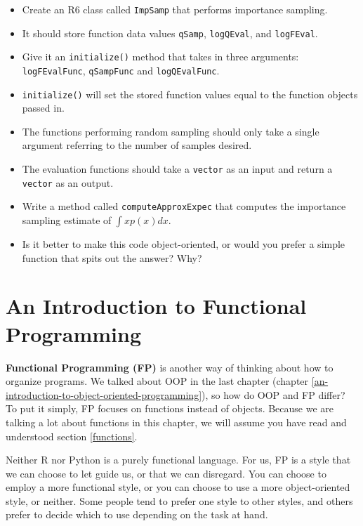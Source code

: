 \documentclass[12pt,krantz2]{krantz}
\providecommand{\tightlist}{%
  \setlength{\itemsep}{0pt}\setlength{\parskip}{0pt}}
\begin{document}
\begin{itemize}
\tightlist
\item
  Create an R6 class called \texttt{ImpSamp} that performs importance sampling.
\item
  It should store function data values \texttt{qSamp}, \texttt{logQEval}, and \texttt{logFEval}.
\item
  Give it an \texttt{initialize()} method that takes in three arguments: \texttt{logFEvalFunc}, \texttt{qSampFunc} and \texttt{logQEvalFunc}.
\item
  \texttt{initialize()} will set the stored function values equal to the function objects passed in.
\item
  The functions performing random sampling should only take a single argument referring to the number of samples desired.
\item
  The evaluation functions should take a \texttt{vector} as an input and return a \texttt{vector} as an output.
\item
  Write a method called \texttt{computeApproxExpec} that computes the importance sampling estimate of \(\int x p(x) dx\).
\item
  Is it better to make this code object-oriented, or would you prefer a simple function that spits out the answer? Why?
\end{itemize}

\hypertarget{an-introduction-to-functional-programming}{%
\chapter{An Introduction to Functional Programming}\label{an-introduction-to-functional-programming}}

\textbf{Functional Programming (FP)} is another way of thinking about how to organize programs. We talked about OOP in the last chapter (chapter \ref{an-introduction-to-object-oriented-programming}), so how do OOP and FP differ? To put it simply, FP focuses on functions instead of objects. Because we are talking a lot about functions in this chapter, we will assume you have read and understood section \ref{functions}.

Neither R nor Python is a purely functional language. For us, FP is a style that we can choose to let guide us, or that we can disregard. You can choose to employ a more functional style, or you can choose to use a more object-oriented style, or neither. Some people tend to prefer one style to other styles, and others prefer to decide which to use depending on the task at hand.
\end{document}

